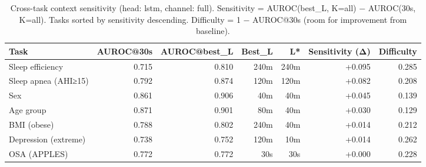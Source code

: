 \begin{table}[ht]
\centering
\caption{Cross-task context sensitivity (head: lstm, channel: full). Sensitivity = AUROC(best\_L, K=all) − AUROC(30s, K=all). Tasks sorted by sensitivity descending. Difficulty = 1 − AUROC@30s (room for improvement from baseline).}
\label{tab:sensitivity_full_lstm}
\begin{tabular}{lrrrrrr}
\toprule
Task & AUROC@30s & AUROC@best_L & Best_L & L* & Sensitivity (Δ) & Difficulty \\
\midrule
Sleep efficiency & 0.715 & 0.810 & 240m & 240m & +0.095 & 0.285 \\
Sleep apnea (AHI≥15) & 0.792 & 0.874 & 120m & 120m & +0.082 & 0.208 \\
Sex & 0.861 & 0.906 & 40m & 40m & +0.045 & 0.139 \\
Age group & 0.871 & 0.901 & 80m & 40m & +0.030 & 0.129 \\
BMI (obese) & 0.788 & 0.802 & 240m & 40m & +0.014 & 0.212 \\
Depression (extreme) & 0.738 & 0.752 & 120m & 10m & +0.014 & 0.262 \\
OSA (APPLES) & 0.772 & 0.772 & 30s & 30s & +0.000 & 0.228 \\
\bottomrule
\end{tabular}
\end{table}